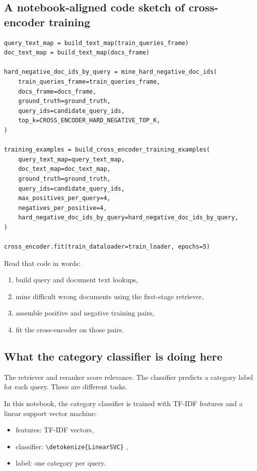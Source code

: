 \documentclass[10pt]{article}
\DeclareRobustCommand{\code}[1]{%
  \ifmmode
    \text{\nolinkurl{\detokenize{#1}}}%
  \else
    \nolinkurl{\detokenize{#1}}%
  \fi
}
\begin{document}
\subsection{A notebook-aligned code sketch of cross-encoder training}

\begin{lstlisting}[caption={Simplified logic for building cross-encoder training pairs}]
query_text_map = build_text_map(train_queries_frame)
doc_text_map = build_text_map(docs_frame)

hard_negative_doc_ids_by_query = mine_hard_negative_doc_ids(
    train_queries_frame=train_queries_frame,
    docs_frame=docs_frame,
    ground_truth=ground_truth,
    query_ids=candidate_query_ids,
    top_k=CROSS_ENCODER_HARD_NEGATIVE_TOP_K,
)

training_examples = build_cross_encoder_training_examples(
    query_text_map=query_text_map,
    doc_text_map=doc_text_map,
    ground_truth=ground_truth,
    query_ids=candidate_query_ids,
    max_positives_per_query=4,
    negatives_per_positive=4,
    hard_negative_doc_ids_by_query=hard_negative_doc_ids_by_query,
)

cross_encoder.fit(train_dataloader=train_loader, epochs=5)
\end{lstlisting}

Read that code in words:
\begin{enumerate}
    \item build query and document text lookups,
    \item mine difficult wrong documents using the first-stage retriever,
    \item assemble positive and negative training pairs,
    \item fit the cross-encoder on those pairs.
\end{enumerate}

\subsection{What the category classifier is doing here}

The retriever and reranker score relevance. The classifier predicts a category label for each query. These are different tasks.

In this notebook, the category classifier is trained with TF-IDF features and a linear support vector machine:
\begin{itemize}
    \item features: TF-IDF vectors,
    \item classifier: \code{LinearSVC},
    \item label: one category per query.
\end{itemize}
\end{document}
